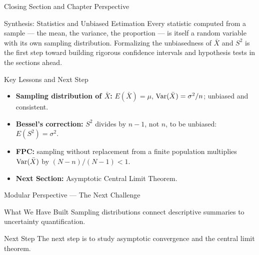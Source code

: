 \documentclass[aspectratio=169,xcolor={dvipsnames,table}]{beamer}
\begin{document}
\begin{frame}{Closing Section and Chapter Perspective}
	\vspace{-0.2cm}
	\begin{block}{Synthesis: Statistics and Unbiased Estimation}
		\scriptsize
		Every statistic computed from a sample --- the mean, the variance, the proportion --- is itself a random variable with its own sampling distribution. Formalizing the unbiasedness of $\bar{X}$ and $S^2$ is the first step toward building rigorous confidence intervals and hypothesis tests in the sections ahead.
	\end{block}
	\vspace{0.05cm}
	\pause
	\begin{alertblock}{Key Lessons and Next Step}
		\begin{itemize}\itemsep=0.05cm
			\item \textbf{Sampling distribution of $\bar{X}$:} $E(\bar{X})=\mu$, $\operatorname{Var}(\bar{X})=\sigma^2/n$; unbiased and consistent.
			\item \textbf{Bessel's correction:} $S^2$ divides by $n-1$, not $n$, to be unbiased: $E(S^2)=\sigma^2$.
			\item \textbf{FPC:} sampling without replacement from a finite population multiplies $\operatorname{Var}(\bar{X})$ by $(N-n)/(N-1) < 1$.
			\item \textbf{Next Section:} \textcolor{TecRojo}{Asymptotic Central Limit Theorem}.
		\end{itemize}
	\end{alertblock}
\end{frame}

\begin{frame}{Modular Perspective --- The Next Challenge}
  \small
  \begin{block}{What We Have Built}
    Sampling distributions connect descriptive summaries to uncertainty quantification.
  \end{block}
  \pause
  \begin{alertblock}{Next Step}
    The next step is to study asymptotic convergence and the central limit theorem.
  \end{alertblock}
\end{frame}
\end{document}
